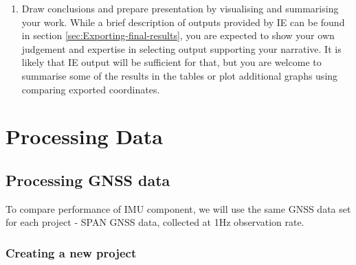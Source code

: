 \documentclass[11pt,fleqn]{book} %
\begin{document}
\begin{enumerate}
\begin{enumerate}
	\end{enumerate}
	\item Draw conclusions and prepare presentation by visualising and summarising your work. While a brief description of outputs provided by IE can be found in section \ref{sec:Exporting-final-results}, you are expected to show your own judgement and expertise in selecting output supporting your narrative. It is likely that IE output will be sufficient for that, but you are welcome to summarise some of the results in the tables or plot additional graphs using comparing exported coordinates.
\end{enumerate}


\vspace{2cm}

\part{Processing Data}

\chapter{Processing GNSS data}\label{sec:Processing-GNSS-data}


To compare performance of IMU component, we will use the same GNSS data set for each project - SPAN GNSS data, collected at 1Hz observation rate.

\section{Creating a new project}\label{sec:Create-an-new}
\end{document}
